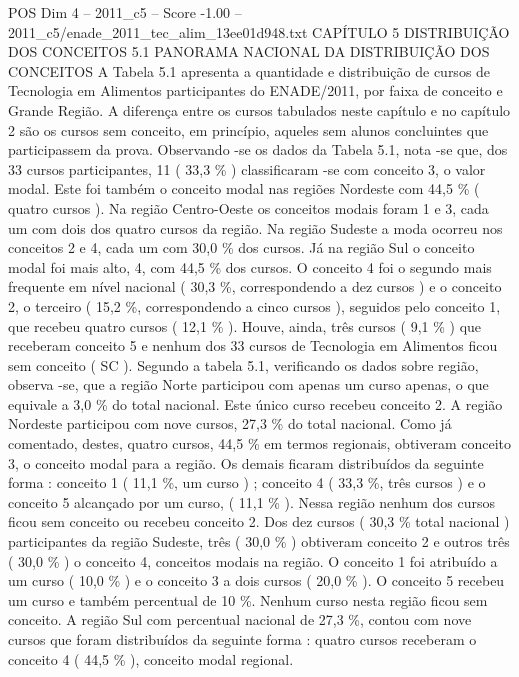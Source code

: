 \begin{textsample}{POS Dim 4 – 2011\_c5 – Score -1.00 – 2011\_c5/enade\_2011\_tec\_alim\_13ee01d948.txt}  \label{ex:f4_pos_243}
CAPÍTULO 5 DISTRIBUIÇÃO DOS CONCEITOS 5.1 PANORAMA NACIONAL DA DISTRIBUIÇÃO DOS CONCEITOS A Tabela 5.1 apresenta a quantidade e distribuição de cursos de Tecnologia em Alimentos participantes do ENADE/2011, por faixa de conceito e Grande Região.
A diferença entre os cursos tabulados neste capítulo e no capítulo 2 são os cursos sem conceito, em princípio, aqueles sem alunos concluintes que participassem da prova.
Observando -se os dados da Tabela 5.1, nota -se que, dos 33 cursos participantes, 11 ( 33,3 \% ) classificaram -se com conceito 3, o valor modal.
Este foi também o conceito modal nas regiões Nordeste com 44,5 \% ( quatro cursos ).
Na região Centro-Oeste os conceitos modais foram 1 e 3, cada um com dois dos quatro cursos da região.
Na região Sudeste a moda ocorreu nos conceitos 2 e 4, cada um com 30,0 \% dos cursos.
Já na região Sul o conceito modal foi mais alto, 4, com 44,5 \% dos cursos.
O conceito 4 foi o segundo mais frequente em nível nacional ( 30,3 \%, correspondendo a dez cursos ) e o conceito 2, o terceiro ( 15,2 \%, correspondendo a cinco cursos ), seguidos pelo conceito 1, que recebeu quatro cursos ( 12,1 \% ).
Houve, ainda, três cursos ( 9,1 \% ) que receberam conceito 5 e nenhum dos 33 cursos de Tecnologia em Alimentos ficou sem conceito ( SC ).
Segundo a tabela 5.1, verificando os dados sobre região, observa -se, que a região Norte participou com apenas um curso apenas, o que equivale a 3,0 \% do total nacional.
Este único curso recebeu conceito 2.
A região Nordeste participou com nove cursos, 27,3 \% do total nacional.
Como já comentado, destes, quatro cursos, 44,5 \% em termos regionais, obtiveram conceito 3, o conceito modal para a região.
Os demais ficaram distribuídos da seguinte forma : conceito 1 ( 11,1 \%, um curso ) ; conceito 4 ( 33,3 \%, três cursos ) e o conceito 5 alcançado por um curso, ( 11,1 \% ).
Nessa região nenhum dos cursos ficou sem conceito ou recebeu conceito 2.
Dos dez cursos ( 30,3 \% total nacional ) participantes da região Sudeste, três ( 30,0 \% ) obtiveram conceito 2 e outros três ( 30,0 \% ) o conceito 4, conceitos modais na região.
O conceito 1 foi atribuído a um curso ( 10,0 \% ) e o conceito 3 a dois cursos ( 20,0 \% ).
O conceito 5 recebeu um curso e também percentual de 10 \%.
Nenhum curso nesta região ficou sem conceito.
A região Sul com percentual nacional de 27,3 \%, contou com nove cursos que foram distribuídos da seguinte forma : quatro cursos receberam o conceito 4 ( 44,5 \% ), conceito modal regional.

\end{textsample}
